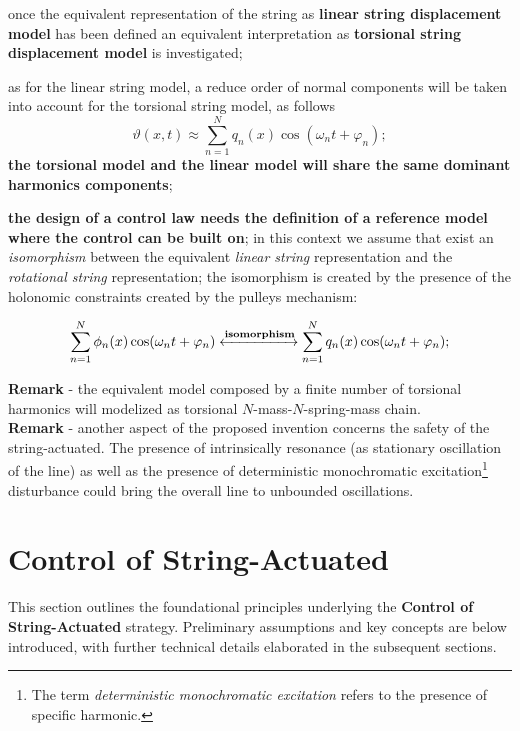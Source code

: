 \documentclass[12pt,a4paper]{scrartcl}
\begin{document}
\begin{onehalfspace}
\begin{myitemize_1}
	\item[--] once the equivalent representation of the string as \textbf{linear string displacement model} has been defined an equivalent interpretation as \textbf{torsional string displacement model} is investigated;
	\item[--] as for the linear string model, a reduce order of normal components will be taken into account for the torsional string model, as follows
	\begin{equation}
		\vartheta(x,t) \approx \sum_{n=1}^{N}q_n(x)\cos(\omega_n t + \varphi_n);
	\end{equation} 
	\textbf{	the torsional model and the linear model will share the same dominant harmonics components};
	\item[--] \textbf{the design of a control law needs the definition of a reference model where the control can be built on}; in this context we assume that exist an \textit{isomorphism} between the equivalent \textit{linear string} representation and the \textit{rotational string} representation; the isomorphism is created by the presence of the holonomic constraints created by the pulleys mechanism:
	\begin{mybox}
		\begin{equation}
			\sum_{n=1}^{N}\phi_n(x)\cos(\omega_n t + \varphi_n) \xleftrightarrow{\text{\textbf{isomorphism}}} \sum_{n=1}^{N}q_n(x)\cos(\omega_n t + \varphi_n);
		\end{equation} 
	\end{mybox}
\end{myitemize_1}
\noindent\textbf{Remark} - the equivalent model composed by a finite number of torsional harmonics will modelized as torsional $N$-mass-$N$-spring-mass chain. \\
	
\noindent\textbf{Remark} - another aspect of the proposed invention concerns the safety of the string-actuated. The presence of intrinsically resonance (as stationary oscillation of the line) as well as the presence of deterministic monochromatic excitation\footnote{The term \textit{deterministic monochromatic excitation} refers to the presence of specific harmonic.} disturbance could bring the overall line to unbounded oscillations.    



\section{Control of String-Actuated}
This section outlines the foundational principles underlying the \textbf{Control of String-Actuated} strategy. Preliminary assumptions and key concepts are below introduced, with further technical details elaborated in the subsequent sections. \\


\end{onehalfspace}
\end{document}
